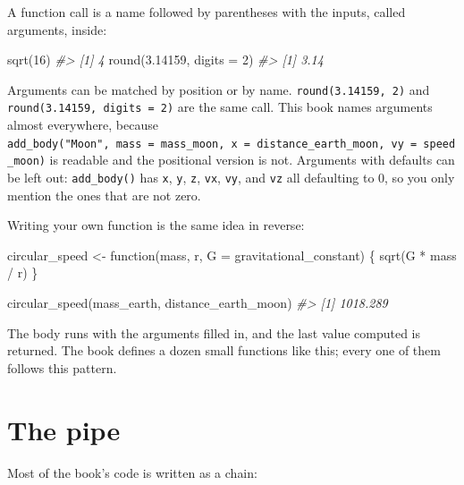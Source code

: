 \documentclass[
  10.5pt,
  letterpaper,
]{scrbook}
\newenvironment{Shaded}{\begin{snugshade}}{\end{snugshade}}
\newcommand{\AttributeTok}[1]{\textcolor[rgb]{0.00,0.00,0.00}{#1}}
\newcommand{\CommentTok}[1]{\textcolor[rgb]{0.00,0.00,0.00}{\textit{#1}}}
\newcommand{\ControlFlowTok}[1]{\textcolor[rgb]{0.00,0.00,0.00}{#1}}
\newcommand{\DecValTok}[1]{\textcolor[rgb]{0.00,0.00,0.00}{#1}}
\newcommand{\FloatTok}[1]{\textcolor[rgb]{0.00,0.00,0.00}{#1}}
\newcommand{\FunctionTok}[1]{\textcolor[rgb]{0.00,0.00,0.00}{#1}}
\newcommand{\NormalTok}[1]{\textcolor[rgb]{0.00,0.00,0.00}{#1}}
\newcommand{\OtherTok}[1]{\textcolor[rgb]{0.00,0.00,0.00}{#1}}
\newcommand{\SpecialCharTok}[1]{\textcolor[rgb]{0.00,0.00,0.00}{#1}}
\theoremstyle{plain}
\theoremstyle{remark}
\begin{document}
A function call is a name followed by parentheses with the inputs,
called arguments, inside:

\begin{Shaded}
\begin{Highlighting}[]
\FunctionTok{sqrt}\NormalTok{(}\DecValTok{16}\NormalTok{)}
\CommentTok{\#\textgreater{} [1] 4}
\FunctionTok{round}\NormalTok{(}\FloatTok{3.14159}\NormalTok{, }\AttributeTok{digits =} \DecValTok{2}\NormalTok{)}
\CommentTok{\#\textgreater{} [1] 3.14}
\end{Highlighting}
\end{Shaded}

Arguments can be matched by position or by name.
\texttt{round(3.14159,\ 2)} and \texttt{round(3.14159,\ digits\ =\ 2)}
are the same call. This book names arguments almost everywhere, because
\texttt{add\_body("Moon",\ mass\ =\ mass\_moon,\ x\ =\ distance\_earth\_moon,\ vy\ =\ speed\_moon)}
is readable and the positional version is not. Arguments with defaults
can be left out: \texttt{add\_body()} has \texttt{x}, \texttt{y},
\texttt{z}, \texttt{vx}, \texttt{vy}, and \texttt{vz} all defaulting to
0, so you only mention the ones that are not zero.

Writing your own function is the same idea in reverse:

\begin{Shaded}
\begin{Highlighting}[]
\NormalTok{circular\_speed }\OtherTok{\textless{}{-}} \ControlFlowTok{function}\NormalTok{(mass, r, }\AttributeTok{G =}\NormalTok{ gravitational\_constant) \{}
  \FunctionTok{sqrt}\NormalTok{(G }\SpecialCharTok{*}\NormalTok{ mass }\SpecialCharTok{/}\NormalTok{ r)}
\NormalTok{\}}

\FunctionTok{circular\_speed}\NormalTok{(mass\_earth, distance\_earth\_moon)}
\CommentTok{\#\textgreater{} [1] 1018.289}
\end{Highlighting}
\end{Shaded}

The body runs with the arguments filled in, and the last value computed
is returned. The book defines a dozen small functions like this; every
one of them follows this pattern.

\section{The pipe}\label{the-pipe}

Most of the book's code is written as a chain:
\end{document}
